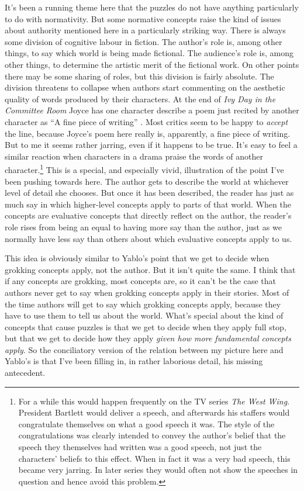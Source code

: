 It's been a running theme here that the puzzles do not have anything particularly to do with normativity. But some normative concepts raise the kind of issues about authority mentioned here in a particularly striking way. There is always some division of cognitive labour in fiction. The author's role is, among other things, to say which world is being made fictional. The audience's role is, among other things, to determine the artistic merit of the fictional work. On other points there may be some sharing of roles, but this division is fairly absolute. The division threatens to collapse when authors start commenting on the aesthetic quality of words produced by their characters. At the end of \textit{Ivy Day in the Committee Room} Joyce has one character describe a poem just recited by another character as ``A fine piece of writing'' \cite[105]{Joyce1914}. Most critics seem to be happy to \textit{accept }the line, because Joyce's poem here really is, apparently, a fine piece of writing. But to me it seems rather jarring, even if it happens to be true. It's easy to feel a similar reaction when characters in a drama praise the words of another character.\footnote{For a while this would happen frequently on the TV series \textit{The West Wing}. President Bartlett would deliver a speech, and afterwards his staffers would congratulate themselves on what a good speech it was. The style of the congratulations was clearly intended to convey the author's belief that the speech they themselves had written was a good speech, not just the characters' beliefs to this effect. When in fact it was a very bad speech, this became very jarring. In later series they would often not show the speeches in question and hence avoid this problem.} This is a special, and especially vivid, illustration of the point I've been pushing towards here. The author gets to describe the world at whichever level of detail she chooses. But once it has been described, the reader has just as much say in which higher-level concepts apply to parts of that world. When the concepts are evaluative concepts that directly reflect on the author, the reader's role rises from being an equal to having more say than the author, just as we normally have less say than others about which evaluative concepts apply to us.

This idea is obviously similar to Yablo's point that we get to decide when grokking concepts apply, not the author. But it isn't quite the same. I think that if any concepts are grokking, most concepts are, so it can't be the case that authors never get to say when grokking concepts apply in their stories. Most of the time authors will get to say which grokking concepts apply, because they have to use them to tell us about the world. What's special about the kind of concepts that cause puzzles is that we get to decide when they apply full stop, but that we get to decide how they apply \textit{given how more fundamental concepts apply}. So the conciliatory version of the relation between my picture here and Yablo's is that I've been filling in, in rather laborious detail, his missing antecedent.

